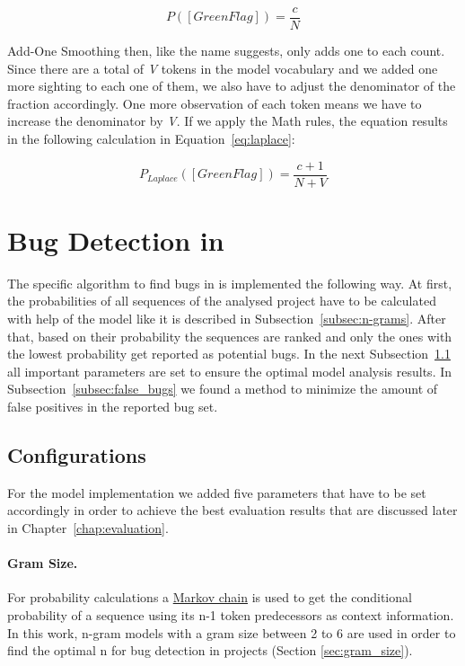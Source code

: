 \begin{equation} \label{eq:likelihood}
P([GreenFlag]) ={} \frac{c}{N}
\end{equation}

Add-One Smoothing then, like the name suggests, only adds one to each count. Since there are a total of \textit{V} tokens in the model vocabulary and we added one more sighting to each one of them, we also have to adjust the denominator of the fraction accordingly. One more observation of each token means we have to increase the denominator by \textit{V}. If we apply the Math rules, the equation results in the following calculation in Equation~\ref{eq:laplace}:

\begin{equation} \label{eq:laplace}
P_{Laplace}([GreenFlag]) ={} \frac{c + 1}{N + V}
\end{equation}


\section{Bug Detection in \scratch{}}\label{sec:detection}
The specific algorithm to find bugs in \scratch{} is implemented the following way. At first, the probabilities of all sequences of the analysed project have to be calculated with help of the model like it is described in Subsection~\ref{subsec:n-grams}. After that, based on their probability the sequences are ranked and only the ones with the lowest probability get reported as potential bugs. In the next Subsection~\ref{subsec:configurations} all important parameters are set to ensure the optimal model analysis results. In Subsection~\ref{subsec:false_bugs} we found a method to minimize the amount of false positives in the reported bug set.

\subsection{Configurations}\label{subsec:configurations}
For the \scratch{} model implementation we added five parameters that have to be set accordingly in order to achieve the best evaluation results that are discussed later in Chapter~\ref{chap:evaluation}.

\paragraph{Gram Size.}
For probability calculations a \hyperref[def:markov_chain]{Markov chain} is used to get the conditional probability of a sequence using its n-1 token predecessors as context information. In this work, n-gram models with a gram size between 2 to 6 are used in order to find the optimal n for bug detection in \scratch{} projects (Section \ref{sec:gram_size}). 
